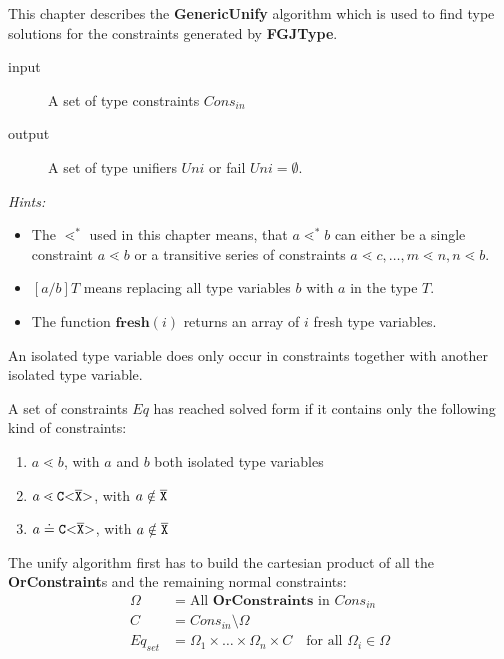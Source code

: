 \label{sec:unify}
This chapter describes the \textbf{GenericUnify} algorithm
which is used to find type solutions for the constraints generated by \textbf{FGJType}.

\begin{description}
\item[input] A set of type constraints $Cons_{in}$ %
\item[output] A set of type unifiers $Uni$
or fail $Uni = \emptyset$.
\end{description}

\textit{Hints:}
\begin{itemize}
\item The $\lessdot^*$ used in this chapter means,
that $a \lessdot^* b$ can either be a single constraint $a \lessdot b$ or a transitive series of constraints
$a \lessdot c, \ldots, m \lessdot n, n \lessdot b$.
\item $[a/b]T$ means replacing all type variables $b$ with $a$ in the type $T$.
\item The function $\textbf{fresh}(i)$ returns an array of $i$ fresh type variables.
\end{itemize}
\begin{definition} \label{def:isolated-type-variable}
    \textrm
  An isolated type variable does only occur in constraints together with another isolated type variable.
  \end{definition}
  
  \begin{definition}\label{def:solved-form}
    \textrm
    A set of constraints $Eq$ has reached solved form if it contains only the following kind of constraints:
    \begin{enumerate}
      \item $a \lessdot b$, with $a$ and $b$ both isolated type variables
      \item $a \lessdot \mathtt{C {\tt <} \overline{\tt X} {\tt >} }$, with $a \notin \overline{\tt X}$ %
      \item $a \doteq \mathtt{C {\tt <} \overline{\tt X} {\tt >} }$, with $a \notin \overline{\tt X}$
    \end{enumerate}
  \end{definition}  

The unify algorithm first has to build the cartesian product of all the \textbf{OrConstraint}s and the remaining normal constraints:
\begin{align*}
\Omega &= \text{All }\mathbf{OrConstraints} \text{ in } {Cons}_{in}\\
C &= {Cons}_{in} \setminus \Omega \\
Eq_{set} &= \Omega_1 \times \ldots \times \Omega_n \times C \quad \text{for all }\Omega_i \in \Omega
\end{align*}

